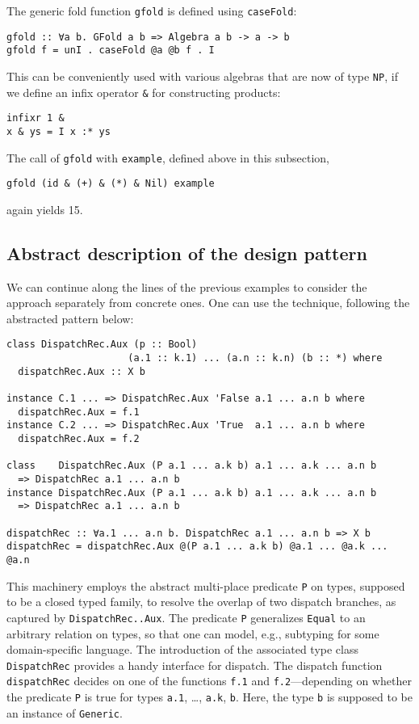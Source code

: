 \documentclass[runningheads]{llncs}
\newcommand{\K}[1]{\lstinline[style=fancy]{#1}}
\begin{document}
The generic fold function \K{gfold} is defined using \K{caseFold}:
\begin{lstlisting}[style=fancy]
gfold :: ∀a b. GFold a b => Algebra a b -> a -> b
gfold f = unI . caseFold @a @b f . I
\end{lstlisting}

This can be conveniently used with various algebras that are now of type \K{NP}, if we define an infix operator \K{&} for constructing products:
\begin{lstlisting}[style=fancy]
infixr 1 &
x & ys = I x :* ys
\end{lstlisting}
The call of \K{gfold} with \K{example}, defined above in this subsection,
\begin{lstlisting}[style=fancy]
gfold (id & (+) & (*) & Nil) example
\end{lstlisting}
again yields 15.

\subsection{Abstract description of the design pattern}
\label{subsec:abstract-pattern}


We can continue along the lines of the previous examples to consider the approach separately from concrete ones. One can use the technique, following the abstracted pattern below:

\begin{lstlisting}[style=fancy]
class DispatchRec.Aux (p :: Bool)
                     (a.1 :: k.1) ... (a.n :: k.n) (b :: *) where
  dispatchRec.Aux :: X b

instance C.1 ... => DispatchRec.Aux 'False a.1 ... a.n b where
  dispatchRec.Aux = f.1
instance C.2 ... => DispatchRec.Aux 'True  a.1 ... a.n b where
  dispatchRec.Aux = f.2

class    DispatchRec.Aux (P a.1 ... a.k b) a.1 ... a.k ... a.n b
  => DispatchRec a.1 ... a.n b
instance DispatchRec.Aux (P a.1 ... a.k b) a.1 ... a.k ... a.n b
  => DispatchRec a.1 ... a.n b

dispatchRec :: ∀a.1 ... a.n b. DispatchRec a.1 ... a.n b => X b
dispatchRec = dispatchRec.Aux @(P a.1 ... a.k b) @a.1 ... @a.k ... @a.n
\end{lstlisting}

This machinery employs the abstract multi-place predicate \K{P} on types, supposed to be a closed typed family, to resolve the overlap of two dispatch branches, as captured by \K{DispatchRec..Aux}. The predicate \K{P} generalizes \K{Equal} to an arbitrary relation on types, so that one can model, e.g., subtyping for some domain-specific language. The introduction of the associated type class \K{DispatchRec} provides a handy interface for dispatch. The dispatch function \K{dispatchRec} decides on one of the functions \K{f.1} and \K{f.2}---depending on whether the predicate \K{P} is true for types \K{a.1}, \dots, \K{a.k}, \K{b}. Here, the type \K{b} is supposed to be an instance of \K{Generic}.
\end{document}
